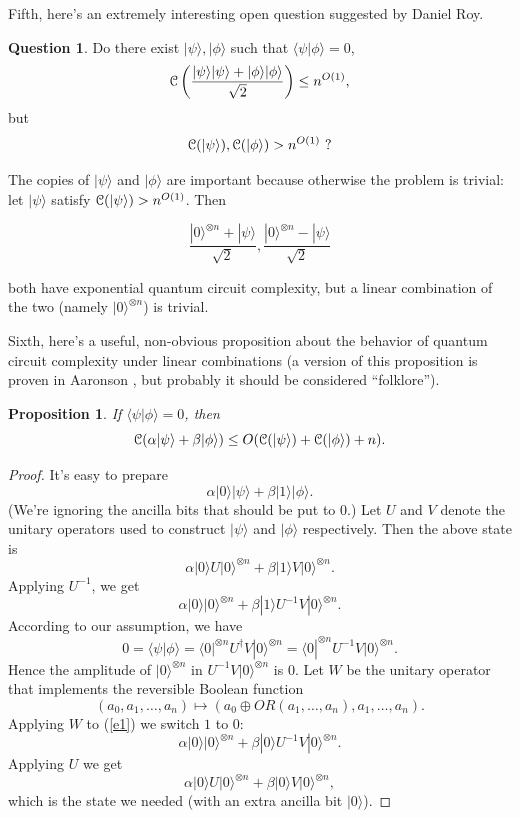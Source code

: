 \documentclass[12pt]{report}
\theoremstyle{plain}
\newtheorem{proposition}[theorem]{Proposition}
\theoremstyle{definition}
\newtheorem{question}[theorem]{Question}
\renewcommand{\bra}[1]{\langle#1|}
\renewcommand{\ket}[1]{|#1\rangle}
\newcommand{\braket}[2]{\langle#1|#2\rangle}
\begin{document}
Fifth, here's an extremely interesting open question suggested by Daniel Roy.

\begin{question}
Do there exist $\ket{\psi},\ket{\phi}$ such that
$\braket{\psi}{\phi}=0$,
\[
{\cal
  C}\left(\frac{\ket{\psi}\ket{\psi}+\ket{\phi}\ket{\phi}}{\sqrt{2}}
\right)\leq n^{O(1)},
\]
but
\[
{\cal C}(\ket{\psi}),{\cal C}(\ket{\phi})> n^{O(1)}\ ?
\]
\end{question}

The copies of  $\ket{\psi}$ and $\ket{\phi}$ are important because otherwise the problem is trivial: let $\ket{\psi}$ satisfy ${\cal C}(\ket{\psi}) > n^{O(1)}$.
Then

$$\frac{\ket{0}^{\otimes n}+\ket{\psi}}{\sqrt{2}}, \frac{\ket{0}^{\otimes n}-\ket{\psi}}{\sqrt{2}}$$

\noindent both have exponential quantum circuit complexity, but a linear combination of the two (namely $\ket{0}^{\otimes n}$) is trivial.

Sixth, here's a useful, non-obvious proposition about the behavior of quantum circuit complexity under linear combinations (a version of this proposition is proven in Aaronson \cite{aar:mlin}, but probably it should be considered ``folklore'').

\begin{proposition}
\label{lincomb}
If $\braket{\psi}{\phi}=0$, then
\[
{\cal C}(\alpha\ket{\psi}+\beta\ket{\phi})\leq
O({\cal C}(\ket{\psi})+{\cal C}(\ket{\phi})+n).
\]
\end{proposition}
\begin{proof}
It's easy to prepare
\[
\alpha\ket{0}\ket{\psi}+\beta\ket{1}\ket{\phi}.
\]
(We're ignoring the ancilla bits that should be put to $0$.)
Let $U$ and $V$ denote the unitary operators used to
construct $\ket{\psi}$ and $\ket{\phi}$ respectively. Then the above
state is
\[
\alpha\ket{0} U \ket{0}^{\otimes n}+\beta \ket{1} V \ket{0}^{\otimes n}.
\]
Applying $U^{-1}$, we get
\begin{equation}\label{e1}
\alpha \ket{0} \ket{0}^{\otimes n}+\beta \ket{1} U^{-1}V \ket{0}^{\otimes n}.
\end{equation}
According to our assumption, we have
\[
0=\braket{\psi}{\phi}=\bra{0}^{\otimes
  n} U^\dagger V\ket{0}^{\otimes n} = \bra{0}^{\otimes n} U^{-1}V \ket{0}^{\otimes n}.
\]
Hence the amplitude of $\ket{0}^{\otimes n}$ in
$U^{-1}V\ket{0}^{\otimes n}$ is $0$. Let $W$ be the unitary
operator that implements the reversible Boolean function
\[
(a_0,a_1,\dots,a_n)\mapsto (a_0\oplus OR(a_1,\dots,a_n),a_1,\dots,a_n).
\]
Applying $W$ to (\ref{e1}) we switch $1$ to $0$:
\[
\alpha \ket{0} \ket{0}^{\otimes n}+\beta \ket{0} U^{-1}V \ket{0}^{\otimes n}.
\]
Applying $U$ we get
\[
\alpha \ket{0} U \ket{0}^{\otimes n}+\beta \ket{0} V \ket{0}^{\otimes n},
\]
which is the state we needed (with an extra ancilla bit $\ket{0}$).
\end{proof}
\end{document}
